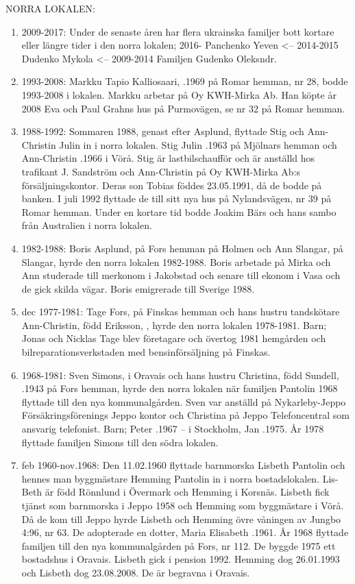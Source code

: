NORRA LOKALEN:
\begin{enumerate}
  \item 2009-2017: Under de senaste åren har flera ukrainska familjer bott kortare eller längre tider i den norra lokalen; 2016-	Panchenko Yeven <-- 2014-2015	Dudenko Mykola <-- 2009-2014	Familjen Gudenko Oleksndr.
  \item 1993-2008: Markku Tapio Kalliosaari, .1969 på Romar hemman, nr 28, bodde 1993-2008 i lokalen. Markku arbetar på Oy KWH-Mirka Ab. Han köpte år 2008 Eva och Paul Grahns hus på Purmovägen, se nr 32 på Romar hemman.
  \item 1988-1992: Sommaren 1988, genast efter Asplund, flyttade Stig och Ann-Christin Julin in i norra lokalen. Stig Julin .1963 på Mjölnars hemman och Ann-Christin .1966 i Vörå. Stig är lastbilschaufför och är anställd hos trafikant J. Sandström och Ann-Christin på Oy KWH-Mirka Ab:s försäljningskontor. Deras son Tobias föddes 23.05.1991, då de bodde på banken. I juli 1992 flyttade de till sitt nya hus på Nylandsvägen, nr 39 på Romar hemman.
  Under en kortare tid bodde Joakim Bärs och hans sambo från Australien i norra lokalen.
  \item 1982-1988: Boris Asplund,  på Fors hemman på Holmen och Ann Slangar,  på Slangar, hyrde den norra lokalen 1982-1988. Boris arbetade på Mirka och Ann studerade till merkonom i Jakobstad och senare till ekonom i Vasa och de gick skilda vägar. Boris emigrerade till Sverige 1988.
  \item dec 1977-1981: 	Tage Fors,  på Finskas hemman och hans hustru tandskötare Ann-Christin, född Eriksson, , hyrde den norra lokalen 1978-1981. Barn;	Jonas	 och	Nicklas		Tage blev företagare och övertog 1981 hemgården och bilreparationsverkstaden med bensinförsäljning på Finskas.
  \item 1968-1981: Sven Simons,  i Oravais och hans hustru Christina, född Sundell, .1943 på Fors hemman, hyrde den norra lokalen när familjen Pantolin 1968 flyttade till den nya kommunalgården. Sven var anställd på Nykarleby-Jeppo Försäkringsförenings Jeppo kontor och Christina på Jeppo Telefoncentral som ansvarig telefonist. Barn;	Peter .1967	--   i Stockholm, Jan	.1975. År 1978 flyttade familjen Simons till den södra lokalen.
  \item feb 1960-nov.1968: Den 11.02.1960 flyttade barnmorska Lisbeth Pantolin och hennes 	man byggmästare Hemming Pantolin in i norra bostadslokalen. Lis-Beth är född Rönnlund  i Övermark och Hemming  i Korsnäs. Lisbeth fick tjänst som barnmorska i Jeppo 1958 och Hemming som byggmästare i Vörå. Då de kom till Jeppo hyrde Lisbeth och Hemming övre våningen av Jungbo 4:96, nr 63. De adopterade en dotter, Maria Elisabeth .1961. År 1968 flyttade familjen till den nya 	kommunalgården på Fors, nr 112. De byggde 1975 ett bostadshus i Oravais. Lisbeth gick i pension 1992. Hemming dog 26.01.1993 och Lisbeth dog 23.08.2008. De är begravna i Oravais.
\end{enumerate}

